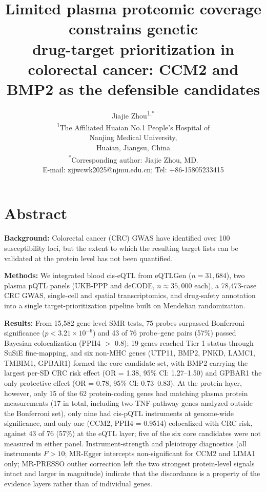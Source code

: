 \documentclass[11pt,a4paper]{article}
\title{Limited plasma proteomic coverage constrains genetic\\drug-target prioritization in colorectal cancer: CCM2 and BMP2 as the defensible candidates}
\author{Jiajie Zhou\textsuperscript{1,*}\\[0.4em]
\normalsize\textsuperscript{1}The Affiliated Huaian No.1 People's Hospital of\\ Nanjing Medical University,\\ Huaian, Jiangsu, China\\[0.3em]
\normalsize\textsuperscript{*}Corresponding author: Jiajie Zhou, MD.\\[0.15em] E-mail: zjjwcwk2025@njmu.edu.cn; Tel: +86-15805233415}
\begin{document}
\linenumbers

\maketitle

\section*{Abstract}

\noindent\textbf{Background:} Colorectal cancer (CRC) GWAS have identified over 100 susceptibility loci, but
the extent to which the resulting target lists can be validated at the protein
level has not been quantified.

\noindent\textbf{Methods:} We integrated blood cis-eQTL from eQTLGen
($n=31,684$), two plasma pQTL panels (UKB-PPP and deCODE, $n\approx35,000$ each),
a 78,473-case CRC GWAS, single-cell and spatial transcriptomics, and drug-safety
annotation into a single target-prioritization pipeline built on Mendelian randomization.

\noindent\textbf{Results:} From 15,582 gene-level
SMR tests, 75 probes surpassed Bonferroni significance ($p<3.21\times10^{-6}$)
and 43 of 76 probe--gene pairs (57\%) passed Bayesian colocalization (PPH4 $>$
0.8); 19 genes reached Tier 1 status through SuSiE fine-mapping, and six non-MHC
genes (UTP11, BMP2, PNKD, LAMC1, TMBIM1, GPBAR1) formed the core candidate set,
with BMP2 carrying the largest per-SD CRC risk effect (OR = 1.38, 95\% CI:
1.27--1.50) and GPBAR1 the only protective effect (OR = 0.78, 95\% CI:
0.73--0.83). At the protein layer, however, only 15 of the 62 protein-coding
genes had matching plasma protein measurements (17 in total, including two
TNF-pathway genes analyzed outside the Bonferroni set), only nine had cis-pQTL instruments
at genome-wide significance, and only one (CCM2, PPH4 = 0.9514) colocalized with
CRC risk, against 43 of 76 (57\%) at the eQTL layer; five of the six core
candidates were not measured in either panel. Instrument-strength and pleiotropy
diagnostics (all instruments $F>10$; MR-Egger intercepts non-significant for
CCM2 and LIMA1 only; MR-PRESSO outlier correction left the two strongest
protein-level signals intact and larger in magnitude) indicate that the discordance is a property of the evidence
layers rather than of individual genes. 
\end{document}

